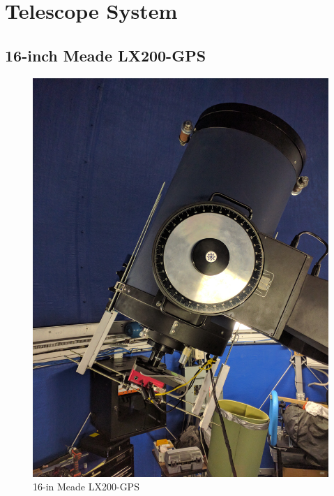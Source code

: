 \section{Telescope System}
\subsection{16-inch Meade LX200-GPS}
\begin{figure}[h]
    \centering
    \includegraphics[width=0.5\columnwidth]{figures/meade.jpg}
    \caption{16-in Meade LX200-GPS}
\label{fig:meade}
\end{figure}

